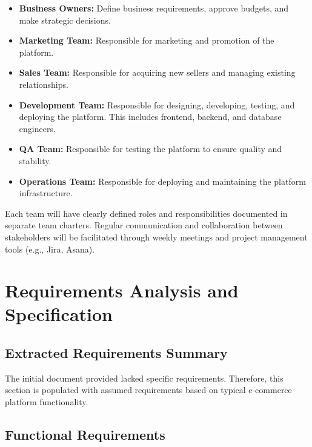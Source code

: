 \documentclass[11pt,a4paper,oneside]{article}
\begin{document}
\begin{itemize}
    \item \textbf{Business Owners:} Define business requirements, approve budgets, and make strategic decisions.
    \item \textbf{Marketing Team:} Responsible for marketing and promotion of the platform.
    \item \textbf{Sales Team:} Responsible for acquiring new sellers and managing existing relationships.
    \item \textbf{Development Team:} Responsible for designing, developing, testing, and deploying the platform.  This includes frontend, backend, and database engineers.
    \item \textbf{QA Team:} Responsible for testing the platform to ensure quality and stability.
    \item \textbf{Operations Team:} Responsible for deploying and maintaining the platform infrastructure.
\end{itemize}

Each team will have clearly defined roles and responsibilities documented in separate team charters.  Regular communication and collaboration between stakeholders will be facilitated through weekly meetings and project management tools (e.g., Jira, Asana).

\section{Requirements Analysis and Specification}

\subsection{Extracted Requirements Summary}
The initial document provided lacked specific requirements.  Therefore, this section is populated with assumed requirements based on typical e-commerce platform functionality.

\subsection{Functional Requirements}
\end{document}
